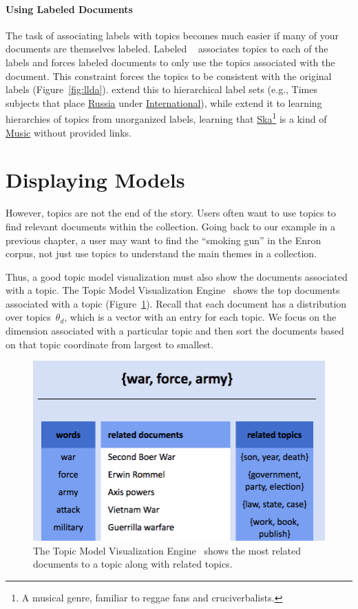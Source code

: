 \paragraph{Using Labeled Documents}

The task of associating labels with topics becomes much easier if many of your
documents are themselves labeled.  Labeled ~\citep{ramage-09}
associates topics to each of the labels and forces labeled documents to only use
the topics associated with the document.  This constraint forces the topics to
be consistent with the original labels (Figure~\ref{fig:llda}).
\citet{Bakalov-12} extend this to hierarchical label sets (e.g.,  Times
subjects that place \underline{Russia} under \underline{International}), while
\citet{nguyen:boyd-graber:resnik:chang-2014} extend it to learning hierarchies
of topics from unorganized labels, learning that \underline{Ska}\footnote{A musical genre, familiar to reggae fans and cruciverbalists.} is a
kind of \underline{Music} without provided links.



\section{Displaying Models}

However, topics are not the end of the story.  Users often want to use topics to
find relevant documents within the collection.  Going back to our
example in a
previous chapter, a user may want to find the ``smoking gun'' in the Enron
corpus, not just use topics to understand the main themes in a collection.

Thus, a good topic model visualization must also show the documents associated
with a topic.  The Topic Model Visualization Engine~\citep[]{chaney-12} shows the
top documents associated with a topic (Figure~\ref{fig:tmve}).  Recall that each
document has a distribution over topics~$\theta_d$, which is a vector with an
entry for each topic.  We focus on the dimension associated with a particular topic
and then sort the documents based on that topic coordinate from largest to
smallest.
\begin{figure}
  \begin{center}
  \includegraphics[width=.7\linewidth]{figures/viz_tmve}
  \end{center}
  \caption{The Topic Model Visualization Engine~\citep{chaney-12}
    shows the most related documents to a topic along with related topics. }
  \label{fig:tmve}
\end{figure}

